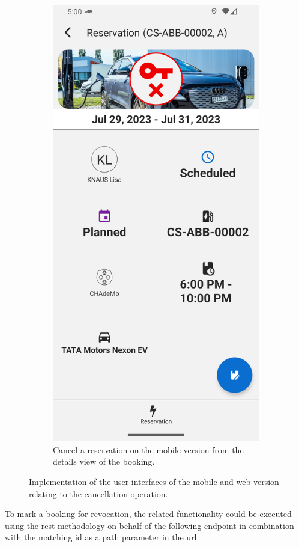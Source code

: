 \begin{figure}[h]
\begin{subfigure}[c]{0.3\textwidth}
        \includegraphics[width=\textwidth,height=1.6\textwidth,keepaspectratio]{resources/images/main/6_implementation/screens/cancel_reservation/mobile/Cancel_Reservation.png}
        \caption{Cancel a reservation on the mobile version from the details view of the booking.}
        \label{fig:mobile-cancel-reservation-impl}
    \end{subfigure}
    \caption{Implementation of the user interfaces of the mobile and web version relating to the cancellation operation.}
    \label{fig:impl-cancel-reservation}
\end{figure}

\noindent To mark a booking for revocation, the related functionality could be executed using the \acrshort{rest} methodology on behalf of the following endpoint in combination with the matching \acrshort{id} as a path parameter in the \acrshort{url}.

